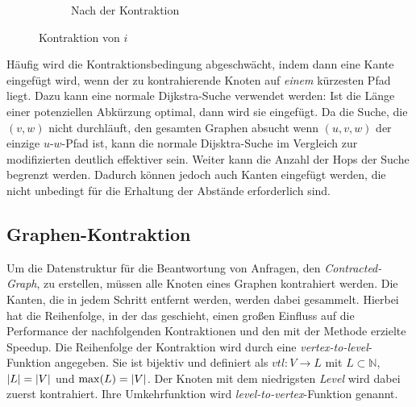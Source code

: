 \begin{figure}[h!]
\begin{subfigure}[b]{0.49\textwidth}
{
    }
    \caption{Nach der Kontraktion}
  \end{subfigure}
  \caption{Kontraktion von $i$}
  \label{graphs:fig:example_contraction}
\end{figure}

Häufig wird die Kontraktionsbedingung abgeschwächt, indem dann eine Kante eingefügt wird, wenn der zu kontrahierende Knoten auf \emph{einem} kürzesten Pfad liegt.
Dazu kann eine normale Dijkstra-Suche verwendet werden: Ist die Länge einer potenziellen Abkürzung optimal, dann wird sie eingefügt.
Da die Suche, die $(v, w)$ nicht durchläuft, den gesamten Graphen absucht wenn $(u, v, w)$ der einzige $u$-$w$-Pfad ist, kann die normale Dijsktra-Suche im Vergleich zur modifizierten deutlich effektiver sein.
Weiter kann die Anzahl der Hops der Suche begrenzt werden.
Dadurch können jedoch auch Kanten eingefügt werden, die nicht unbedingt für die Erhaltung der Abstände erforderlich sind.

\subsection{Graphen-Kontraktion}

Um die Datenstruktur für die Beantwortung von Anfragen, den \emph{Contracted-Graph}, zu erstellen, müssen alle Knoten eines Graphen kontrahiert werden. Die Kanten, die in jedem Schritt entfernt werden, werden dabei gesammelt.
Hierbei hat die Reihenfolge, in der das geschieht, einen großen Einfluss auf die Performance der nachfolgenden Kontraktionen und den mit der Methode erzielte Speedup.
Die Reihenfolge der Kontraktion wird durch eine \emph{vertex-to-level}-Funktion angegeben.
Sie ist bijektiv und definiert als ${vtl} \colon V \to L$ mit $L \subset \mathbb{N}$, $\abs{L} = \abs{V}$ und $\max(L) = \abs{V}$.
Der Knoten mit dem niedrigsten \emph{Level} wird dabei zuerst kontrahiert.
Ihre Umkehrfunktion wird \emph{level-to-vertex}-Funktion genannt.

